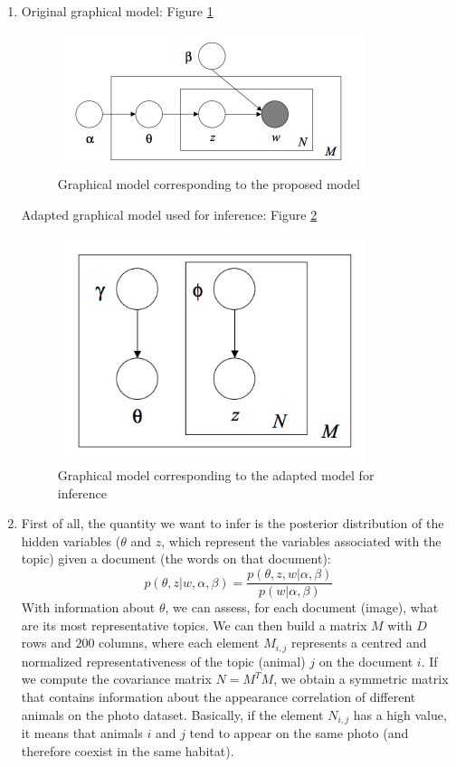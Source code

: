 \documentclass{article}
\begin{document}
\begin{enumerate}
\begin{enumerate}
\item 
Original graphical model: Figure \ref{graphmodeltwo}
\begin{figure}[ht!]
\centering
\includegraphics[width=90mm]{1_1_2.png}
\caption{Graphical model corresponding to the proposed model}
\label{graphmodeltwo}
\end{figure}
Adapted graphical model used for inference: Figure \ref{graphmodeltwoprime}
\begin{figure}[ht!]
\centering
\includegraphics[width=90mm]{1_1_2b.png}
\caption{Graphical model corresponding to the adapted model for inference}
\label{graphmodeltwoprime}
\end{figure}
\item
First of all, the quantity we want to infer is the posterior distribution of the hidden variables ($\theta$ and $z$, which represent the variables associated with the topic) given a document (the words on that document):
\begin{equation*}
p(\theta,z|w,\alpha,\beta) = \frac{p(\theta,z,w|\alpha,\beta)}{p(w|\alpha,\beta)}
\end{equation*}
With information about $\theta$, we can assess, for each document (image), what are its most representative topics. We can then build a matrix $M$ with $D$ rows and $200$ columns, where each element $M_{i,j}$ represents a centred and normalized representativeness of the topic (animal) $j$ on the document $i$.
If we compute the covariance matrix $N = M^TM$, we obtain a symmetric matrix that contains information about the appearance correlation of different animals on the photo dataset. Basically, if the element $N_{i,j}$ has a high value, it means that animals $i$ and $j$ tend to appear on the same photo (and therefore coexist in the same habitat).

\end{enumerate}
\end{enumerate}
\end{document}
